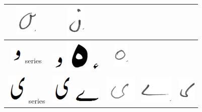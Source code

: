 \begin{table}[h]
\begin{tabular}{@{}ccccc@{}}
\includegraphics[scale=0.20]{34} &  
\includegraphics[scale=0.20]{35}  \\
\hline
\includegraphics[scale=0.20]{wao_orig} series & \includegraphics[scale=0.25]{wao_orig}
\includegraphics[scale= 0.15]{haey_orig}
\includegraphics[scale=0.35]{hamza} & \includegraphics[scale=0.25]{36} & &  \\
\hline
\includegraphics[scale=0.15]{choti_ye_orig} series & \includegraphics[scale=0.15]{choti_ye_orig} \includegraphics[scale=0.20]{bari_ye} &\includegraphics[scale=0.20]{37} &
\includegraphics[scale=0.20]{38} & 
\includegraphics[scale=0.20]{39} \\ 
\hline
\end{tabular}
\end{table}

